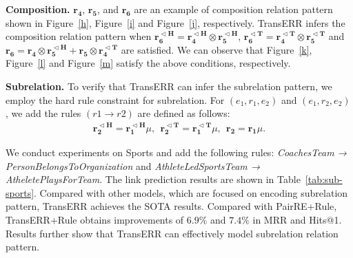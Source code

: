 \documentclass[10pt, a4paper]{article}
\begin{document}
	\textbf{Composition.}
	$\mathbf{r_4}$, $\mathbf{r_5}$, and $\mathbf{r_6}$ are an example of composition relation pattern shown in Figure~\ref{h}, Figure~\ref{i} and Figure~\ref{j}, respectively. TransERR infers the composition relation pattern when $\mathbf{r_6^{\vartriangleleft H}} =\mathbf{r_4^{\vartriangleleft H}} \otimes \mathbf{r_5^{\vartriangleleft H}}$, $\mathbf{r_6^{\vartriangleleft T}} =\mathbf{r_4^{\vartriangleleft T}} \otimes \mathbf{r_5^{\vartriangleleft T}}$ and $\mathbf{r_6} = \mathbf{r_4} \otimes \mathbf{r_5^{\vartriangleleft H}}  + \mathbf{r_5}  \otimes\mathbf{r_4^{\vartriangleleft T}}$  are satisfied. We can observe that Figure~\ref{k}, Figure~\ref{l} and Figure~\ref{m} satisfy the above conditions, respectively.
	
	\textbf{Subrelation.} To verify that TransERR can infer the subrelation pattern, we employ the hard rule constraint for subrelation. For $(e_1,r_1,e_2)$ and  $(e_1,r_2,e_2) $, we add the rules $(r1 \rightarrow  r2)$ are defined as follows:
	\begin{equation}
		\begin{aligned}
			\mathbf{r_2^{\vartriangleleft H}} = {\mathbf{r_1^{\vartriangleleft H}}} \mu, ~~\mathbf{r_2^{\vartriangleleft T}} = {\mathbf{r_1^{\vartriangleleft T}}} \mu, ~~\mathbf{r_2}={\mathbf{r_1}}  \mu.
		\end{aligned}
	\end{equation}
	
	
	We conduct experiments on Sports and add the following rules: \emph{CoachesTeam → PersonBelongsToOrganization} and  \emph{AthleteLedSportsTeam → AtheletePlaysForTeam}.
	The link prediction results are shown in Table~\ref{tab:sub-sports}. Compared with other models, which are focused on encoding subrelation pattern, TransERR achieves the SOTA results.  Compared with PairRE+Rule, TransERR+Rule obtains improvements of $6.9\%$ and $7.4\%$ in MRR and Hits@1. Results further show that TransERR can effectively model subrelation relation pattern.
	
\end{document}
